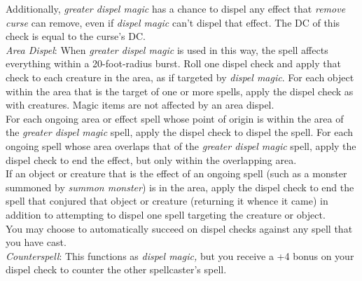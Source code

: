 Additionally, \textit{greater dispel magic }has a chance to dispel any effect that \textit{remove curse }can remove, even if \textit{dispel magic }can't dispel that effect. The DC of this check is equal to the curse's DC.\\
\textit{Area Dispel}: When \textit{greater dispel magic }is used in this way, the spell affects everything within a 20-foot-radius burst. Roll one dispel check and apply that check to each creature in the area, as if targeted by \textit{dispel magic}. For each object within the area that is the target of one or more spells, apply the dispel check as with creatures. Magic items are not affected by an area dispel.\\
For each ongoing area or effect spell whose point of origin is within the area of the \textit{greater dispel magic }spell, apply the dispel check to dispel the spell. For each ongoing spell whose area overlaps that of the \textit{greater dispel magic }spell, apply the dispel check to end the effect, but only within the overlapping area.\\
If an object or creature that is the effect of an ongoing spell (such as a monster summoned by \textit{summon monster}) is in the area, apply the dispel check to end the spell that conjured that object or creature (returning it whence it came) in addition to attempting to dispel one spell targeting the creature or object.\\
You may choose to automatically succeed on dispel checks against any spell that you have cast.\\
\textit{Counterspell}: This functions as \textit{dispel magic, }but you receive a +4 bonus on your dispel check to counter the other spellcaster's spell.\\
